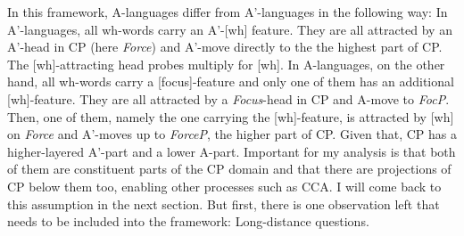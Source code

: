 \documentclass[output=paper,colorlinks,citecolor=brown]{langscibook}
\begin{document}
\noindent In this framework, A-languages differ from A'-languages in the following way: In A'-languages, all wh-words carry an A'-[wh] feature. They are all attracted by an A'-head in CP (here \emph{Force}) and A'-move directly to the the highest part of CP. The [wh]-attracting head probes multiply for [wh]. In A-languages, on the other hand, all wh-words carry a [focus]-feature and only one of them has an additional [wh]-feature. They are all attracted by a \emph{Focus}-head in CP and A-move to \emph{FocP}. Then, one of them, namely the one carrying the [wh]-feature, is attracted by [wh] on \emph{Force} and A'-moves up to \emph{ForceP}, the higher part of CP. Given that, CP has a higher-layered A'-part and a lower A-part. Important for my analysis is that both of them are constituent parts of the CP domain and that there are projections of CP below them too, enabling other processes such as CCA. I will come back to this assumption in the next section. But first, there is one observation left that needs to be included into the framework: Long-distance questions.\\
\end{document}

